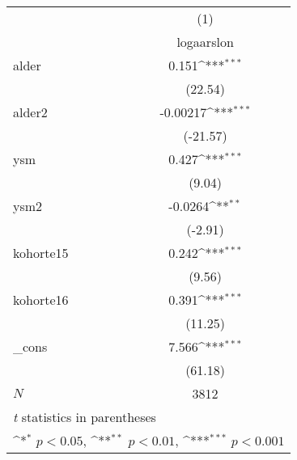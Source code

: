 {
\def\sym#1{\ifmmode^{#1}\else\(^{#1}\)\fi}
\begin{tabular}{l*{1}{c}}
\hline\hline
            &\multicolumn{1}{c}{(1)}\\
            &\multicolumn{1}{c}{logaarslon}\\
\hline
alder       &       0.151\sym{***}\\
            &     (22.54)         \\
[1em]
alder2      &    -0.00217\sym{***}\\
            &    (-21.57)         \\
[1em]
ysm         &       0.427\sym{***}\\
            &      (9.04)         \\
[1em]
ysm2        &     -0.0264\sym{**} \\
            &     (-2.91)         \\
[1em]
kohorte15   &       0.242\sym{***}\\
            &      (9.56)         \\
[1em]
kohorte16   &       0.391\sym{***}\\
            &     (11.25)         \\
[1em]
\_cons      &       7.566\sym{***}\\
            &     (61.18)         \\
\hline
\(N\)       &        3812         \\
\hline\hline
\multicolumn{2}{l}{\footnotesize \textit{t} statistics in parentheses}\\
\multicolumn{2}{l}{\footnotesize \sym{*} \(p<0.05\), \sym{**} \(p<0.01\), \sym{***} \(p<0.001\)}\\
\end{tabular}
}
